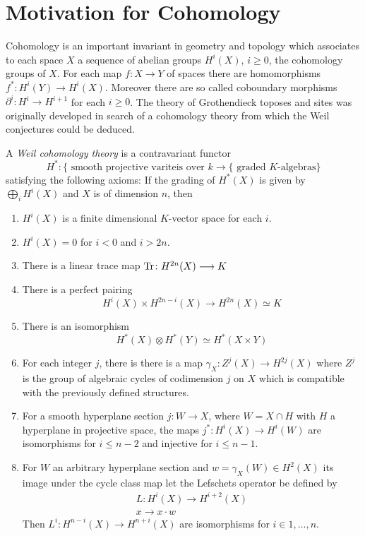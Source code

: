 \section{Motivation for Cohomology}
Cohomology is an important invariant in geometry and topology which associates to each space $X$ a sequence of abelian groups $H^i(X)$, $i \ge 0$, the cohomology groups of $X$. For each map $f: X \to Y$ of spaces there are homomorphisms $f^*: H^i(Y) \to H^i(X)$. Moreover there are so called coboundary morphisms $\partial^i : H^i \to H^{i+1}$ for each $i \ge 0$. The theory of Grothendieck toposes and sites was originally developed in search of a cohomology theory  from which the Weil conjectures could be deduced.
\begin{definition}
	A \textit{Weil cohomology theory} is a contravariant functor
	\[H^* \colon \{ \text{ smooth projective variteis over } k \to \{\text{ graded $K$-algebras}\}\]
	satisfying the following axioms: If the grading of $H^*(X)$ is given by $\displaystyle \bigoplus_i H^i(X)$ and $X$ is of dimension $n$, then
	\begin{enumerate}
		\item $H^i(X)$ is a finite dimensional $K$-vector space for each $i$.
		\item $H^i(X) = 0$ for $i<0$ and $i>2n$.
		\item There is a linear trace map $\operatorname{Tr} \colon H^{2n}(X) \longrightarrow K$
		\item There is a perfect pairing
		      \[ H^i(X) \times H^{2n-i}(X) \to H^{2n}(X) \simeq K\]
		\item There is an isomorphism
		      \[H^*(X) \otimes H^*(Y) \simeq H^*(X \times Y)\]
		\item For each integer $j$, there is there is a map $\gamma_X \colon Z^j(X) \to H^{2j}(X)$ where $Z^j$ is the group of algebraic cycles of codimension $j$ on $X$ which is compatible with the previously defined structures.
		\item For a smooth hyperplane section $j \colon W \to X$, where $W = X \cap H$ with $H$ a hyperplane in projective space, the maps $j^* \colon H^i (X) \to H^i(W)$ are isomorphisms for $i \le n-2$ and injective for $i \le n-1$.
		\item For $W$ an arbitrary hyperplane section and $w = \gamma_X(W) \in H^2(X)$ its image under the cycle class map let the Lefschets operator be defined by
		      \begin{gather*}
			      L \colon H^i(X) \to H^{i+2}(X)\\
			      x \to x \cdot w
		      \end{gather*}
		      Then $L^i \colon H^{n-i}(X) \to H^{n+i}(X)$ are isomorphisms for $i \in {1, \dots, n}$.
	\end{enumerate}
\end{definition}

